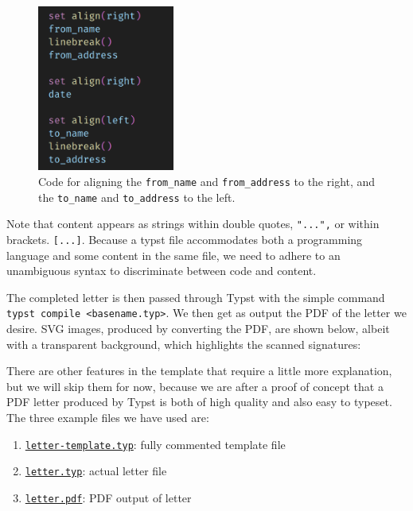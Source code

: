 \documentclass[
  a4paper,
]{article}
\begin{document}
\begin{figure}
\centering
\includegraphics[width=0.4\textwidth,height=\textheight]{images/align-right-left.png}
\caption{Code for aligning the \texttt{from\_name} and
\texttt{from\_address} to the right, and the \texttt{to\_name} and
\texttt{to\_address} to the left.}\label{fig:align}
\end{figure}

Note that content appears as strings within double quotes,
\texttt{"...",} or within brackets. \texttt{{[}...{]}}. Because a typst
file accommodates both a programming language and some content in the
same file, we need to adhere to an unambiguous syntax to discriminate
between code and content.

The completed letter is then passed through Typst with the simple
command \texttt{typst\ compile\ \textless{}basename.typ\textgreater{}}.
We then get as output the PDF of the letter we desire. SVG images,
produced by converting the PDF, are shown below, albeit with a
transparent background, which highlights the scanned signatures:

\begin{center}




\end{center}

There are other features in the template that require a little more
explanation, but we will skip them for now, because we are after a proof
of concept that a PDF letter produced by Typst is both of high quality
and also easy to typeset. The three example files we have used are:

\begin{enumerate}
\item
  \href{auxiliary/letter-template.typ}{\texttt{letter-template.typ}}:
  fully commented template file
\item
  \href{auxiliary/letter.typ}{\texttt{letter.typ}}: actual letter file
\item
  \href{auxiliary/letter.pdf}{\texttt{letter.pdf}}: PDF output of letter
\end{enumerate}
\end{document}
